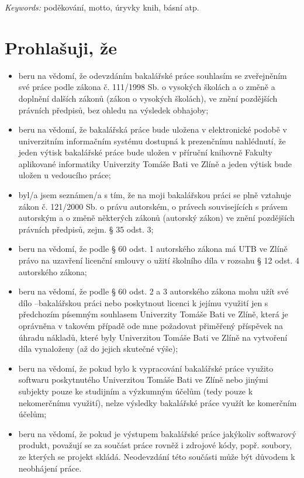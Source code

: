 \documentclass[a4paper,12pt]{article}
\newcommand{\nmm}[1]{\section*{#1}} %
\begin{document}
\emph{Keywords:}
\clearpage
\thispagestyle{empty}
poděkování, motto, úryvky knih, básní atp.
\clearpage
\thispagestyle{empty}
\clearpage
\nmm{Prohlašuji, že}
\begin{itemize}\fontsize{10}{1}
\normalsize
\item beru na vědomí, že odevzdáním bakalářské práce souhlasím se zveřejněním své práce podle zákona č. 111/1998 Sb. o vysokých školách a o změně a doplnění dalších zákonů (zákon o vysokých školách), ve znění pozdějších právních předpisů, bez ohledu na výsledek obhajoby;
\item beru na vědomí, že bakalářská práce bude uložena v elektronické podobě v univerzitním informačním systému dostupná k prezenčnímu nahlédnutí, že jeden výtisk bakalářské práce bude uložen v příruční knihovně Fakulty aplikované informatiky Univerzity Tomáše Bati ve Zlíně a jeden výtisk bude uložen u vedoucího práce; 
\item byl/a jsem seznámen/a s tím, že na moji bakalářskou práci se plně vztahuje zákon č. 121/2000 Sb. o právu autorském, o právech souvisejících s právem autorským a o změně některých zákonů (autorský zákon) ve znění pozdějších právních předpisů, zejm. § 35 odst. 3;
\item beru na vědomí, že podle § 60 odst. 1 autorského zákona má UTB ve Zlíně právo na uzavření licenční smlouvy o užití školního díla v rozsahu § 12 odst. 4 autorského zákona;
\item beru na vědomí, že podle § 60 odst. 2 a 3 autorského zákona mohu užít své dílo –bakalářskou práci nebo poskytnout licenci k jejímu využití jen s předchozím písemným souhlasem Univerzity Tomáše Bati ve Zlíně, která je oprávněna v takovém případě ode mne požadovat přiměřený příspěvek na úhradu nákladů, které byly Univerzitou Tomáše Bati ve Zlíně na vytvoření díla vynaloženy (až do jejich skutečné výše);
\item beru na vědomí, že pokud bylo k vypracování bakalářské práce
využito softwaru poskytnutého Univerzitou Tomáše Bati ve Zlíně nebo jinými
subjekty pouze ke studijním a výzkumným účelům (tedy pouze k nekomerčnímu
využití), nelze výsledky bakalářské práce využít ke komerčním
účelům;
\item beru na vědomí, že pokud je výstupem bakalářské práce jakýkoliv softwarový produkt, považují se za součást práce rovněž i zdrojové kódy, popř. soubory, ze kterých se projekt skládá. Neodevzdání této součásti může být důvodem k neobhájení práce.
\end{itemize}
\end{document}
